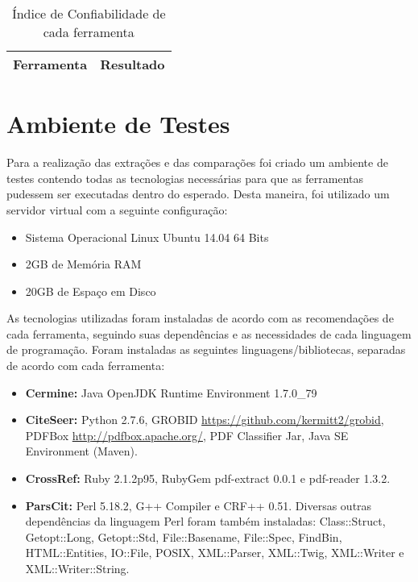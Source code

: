 \begin{table}
    \caption{Índice de Confiabilidade de cada ferramenta}
    \begin{center}
        \begin{tabular}{|p{3cm}|C{3cm}|}
            \hline 
            \textbf{Ferramenta} & \textbf{Resultado} \\ \hline 
            
        \end{tabular}
    \end{center}
    \label{tab:conf-index-results}
\end{table}

\section{Ambiente de Testes}

Para a realização das extrações e das comparações foi criado um ambiente de testes contendo todas as tecnologias necessárias para que as ferramentas pudessem ser executadas dentro do esperado. Desta maneira, foi utilizado um servidor virtual com a seguinte configuração:

\begin{itemize}
    \item Sistema Operacional Linux Ubuntu 14.04 64 Bits
    \item 2GB de Memória RAM
    \item 20GB de Espaço em Disco
\end{itemize}

As tecnologias utilizadas foram instaladas de acordo com as recomendações de cada ferramenta, seguindo suas dependências e as necessidades de cada linguagem de programação. Foram instaladas as seguintes linguagens/bibliotecas, separadas de acordo com cada ferramenta:

\begin{itemize}
    \item \textbf{Cermine:} Java OpenJDK Runtime Environment 1.7.0\_79
    \item \textbf{CiteSeer:} Python 2.7.6, GROBID \url{https://github.com/kermitt2/grobid}, PDFBox \url{http://pdfbox.apache.org/}, PDF Classifier Jar, Java SE Environment (Maven). 
    \item \textbf{CrossRef:} Ruby 2.1.2p95, RubyGem pdf-extract 0.0.1 e pdf-reader 1.3.2.
    \item \textbf{ParsCit:} Perl 5.18.2, G++ Compiler e CRF++ 0.51. Diversas outras dependências da linguagem Perl foram também instaladas: Class::Struct, Getopt::Long, Getopt::Std, File::Basename, File::Spec, FindBin, HTML::Entities, IO::File, POSIX, XML::Parser, XML::Twig, XML::Writer e XML::Writer::String.
\end{itemize}

